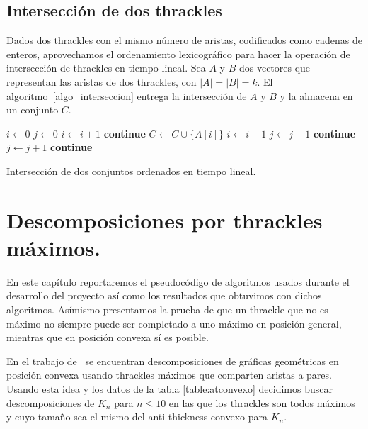 \subsection{Intersección de dos thrackles}
  Dados dos thrackles con el mismo número de aristas, codificados como cadenas
  de enteros, aprovechamos el ordenamiento lexicográfico para hacer la
  operación de intersección de thrackles en tiempo lineal.
  Sea $A$ y $B$ dos vectores que representan las aristas de dos thrackles, con
  $|A|=|B|=k$. El algoritmo~\ref{algo_interseccion} entrega la intersección de $A$ y $B$ y la almacena en un conjunto $C$.
  \begin{algorithm}[htpb]
    \begin{algorithmic}[1]
      \State $i\gets 0$
      \State $j\gets 0$
          \State $i\gets i+1$
          \State \textbf{continue}
        \EndIf
          \State $C\gets C\cup \{A[i]\}$
          \State $i\gets i+1$
          \State $j\gets j+1$
          \State \textbf{continue}
        \EndIf
          \State $j\gets j+1$
          \State \textbf{continue}
        \EndIf
      \EndWhile
      \EndProcedure
    \end{algorithmic}
    \caption{Intersección de dos conjuntos ordenados en tiempo lineal.}
    \label{algo_interseccion}
  \end{algorithm}

\section{Descomposiciones por thrackles máximos.}

En este capítulo reportaremos el pseudocódigo de algoritmos usados durante el desarrollo
del proyecto así como los resultados que obtuvimos con dichos algoritmos.
Asímismo presentamos la prueba de que un thrackle que no es máximo no siempre
puede ser completado a uno máximo en posición general, mientras que en posición
convexa sí es posible.

En el trabajo de~\cite{Fabila-Monroy2018} se encuentran descomposiciones de gráficas
geométricas en posición convexa usando thrackles máximos que comparten aristas a pares.
Usando esta idea y los datos de la tabla \ref{table:atconvexo} decidimos
buscar descomposiciones de $K_n$ para $n \leq 10$ en las que los thrackles
son todos máximos y cuyo tamaño sea el mismo del anti-thickness convexo para $K_n$.


